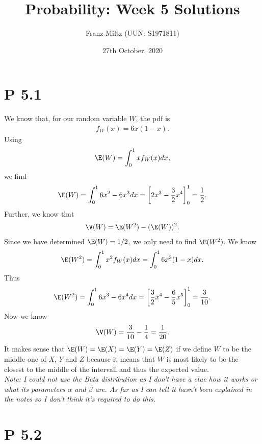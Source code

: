 \documentclass{article}
\begin{document}
\title{Probability: Week 5 Solutions}
\author{Franz Miltz (UUN: S1971811)}
\date{27th October, 2020}
\maketitle


\section*{P 5.1}


We know that, for our random variable $W$, the pdf is
\begin{align*}
	f_W(x) = 6x(1-x).
\end{align*}
Using
\begin{align*}
	\E(W) = \int_0^1 xf_W(x) dx,
\end{align*}
we find
\begin{align*}
	\E(W)=\int_0^1 6x^2-6x^3 dx = \left[2x^3 - \frac{3}{2}x^4\right]^1_0 = \frac{1}{2}.
\end{align*}
Further, we know that
\begin{align*}
	\V(W) = \E(W^2) - (\E(W))^2.
\end{align*}
Since we have determined $\E(W)=1/2$, we only need to find $\E(W^2)$. We know
\begin{align*}
	\E(W^2) = \int_0^1 x^2 f_{W}(x)dx = \int_0^1 6x^3(1-x)dx.
\end{align*}
Thus
\begin{align*}
	\E(W^2) = \int_0^1 6x^3-6x^4 dx = \left[\frac{3}{2} x^4 - \frac{6}{5}x^5\right]_0^1=\frac{3}{10}.
\end{align*}
Now we know
\begin{align*}
	\V(W) = \frac{3}{10}-\frac{1}{4} = \frac{1}{20}.
\end{align*}
It makes sense that $\E(W) = \E(X) = \E(Y) = \E(Z)$ if we define $W$ to be the middle one of $X$, $Y$ and $Z$ because
it means that $W$ is most likely to be the closest to the middle of the intervall and thus the expected value.\\

\emph{Note: I could not use the Beta distribution as I don't have
	a clue how it works or what its parameters $\alpha$ and $\beta$ are.
	As far as I can tell it hasn't been explained in the notes so I don't
	think it's required to do this.}


\section*{P 5.2}
\end{document}
